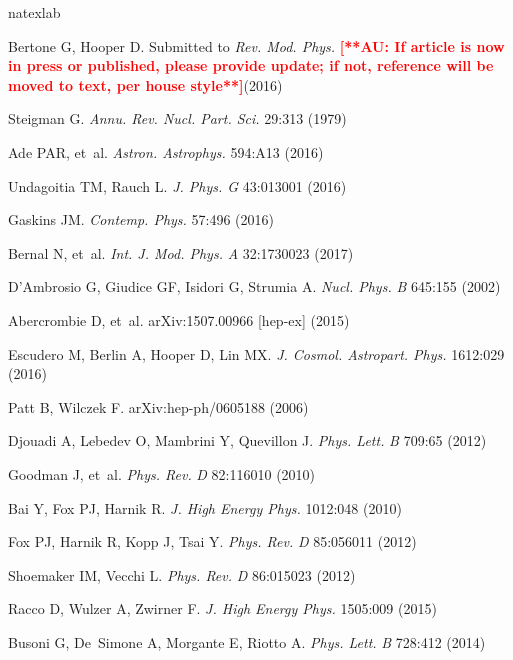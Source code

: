 \documentclass{ar-1col}
\begin{document}
\begin{thebibliography}{175}
\expandafter\ifx\csname
natexlab\endcsname\relax\def\natexlab#1{#1}\fi

Bertone G, Hooper D. Submitted to \textit{Rev. Mod. Phys.}
\textbf{\textcolor{red}{[**AU: If article is now in press or published, please provide update; if not, reference will be moved to text, per house style**]}}(2016)

Steigman G. \textit{Annu. Rev. Nucl. Part. Sci.} 29:313 (1979)

Ade PAR, et~al. \textit{Astron. Astrophys.} 594:A13 (2016)

Undagoitia TM, Rauch L. \textit{J. Phys. G}
43:013001 (2016)

Gaskins JM. \textit{Contemp. Phys.} 57:496 (2016)

Bernal N, et~al. \textit{Int. J. Mod. Phys.} \textit{A} 32:1730023 (2017)

D'Ambrosio G, Giudice GF, Isidori G, Strumia A. \textit{Nucl.
Phys.} \textit{B} 645:155 (2002)

Abercrombie D, et~al. arXiv:1507.00966 [hep-ex] (2015)

Escudero M, Berlin A, Hooper D, Lin MX. \textit{J. Cosmol. Astropart. Phys.} 1612:029
(2016)

Patt B, Wilczek F. arXiv:hep-ph/0605188 (2006)

Djouadi A, Lebedev O, Mambrini Y, Quevillon J. \textit{Phys.
Lett.} \textit{B} 709:65 (2012)

Goodman J, et~al. \textit{Phys. Rev.} \textit{D} 82:116010 (2010)

Bai Y, Fox PJ, Harnik R. \textit{J. High Energy Phys.} 1012:048 (2010)

Fox PJ, Harnik R, Kopp J, Tsai Y. \textit{Phys. Rev.} \textit{D} 85:056011
(2012)

Shoemaker IM, Vecchi L. \textit{Phys. Rev.} \textit{D} 86:015023 (2012)

Racco D, Wulzer A, Zwirner F. \textit{J. High Energy Phys.} 1505:009 (2015)

Busoni G, De~Simone A, Morgante E, Riotto A. \textit{Phys. Lett.}
\textit{B} 728:412 (2014)


\end{thebibliography}
\end{document}
